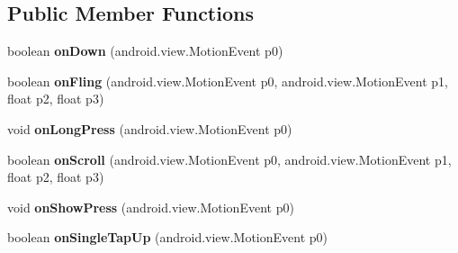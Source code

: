 \subsection*{Public Member Functions}
\begin{DoxyCompactItemize}
\item 
\hypertarget{classmd5282f1122c1313907b9bf274dd2c2f344_1_1InnerGestureListener_a35e0fbcf3351f7095076551b54457c99}{}boolean {\bfseries on\+Down} (android.\+view.\+Motion\+Event p0)\label{classmd5282f1122c1313907b9bf274dd2c2f344_1_1InnerGestureListener_a35e0fbcf3351f7095076551b54457c99}

\item 
\hypertarget{classmd5282f1122c1313907b9bf274dd2c2f344_1_1InnerGestureListener_ad63dbd861add83d141f8ca3b3ffdec62}{}boolean {\bfseries on\+Fling} (android.\+view.\+Motion\+Event p0, android.\+view.\+Motion\+Event p1, float p2, float p3)\label{classmd5282f1122c1313907b9bf274dd2c2f344_1_1InnerGestureListener_ad63dbd861add83d141f8ca3b3ffdec62}

\item 
\hypertarget{classmd5282f1122c1313907b9bf274dd2c2f344_1_1InnerGestureListener_a5aafe59ea26828081a2a01e237f7ae8d}{}void {\bfseries on\+Long\+Press} (android.\+view.\+Motion\+Event p0)\label{classmd5282f1122c1313907b9bf274dd2c2f344_1_1InnerGestureListener_a5aafe59ea26828081a2a01e237f7ae8d}

\item 
\hypertarget{classmd5282f1122c1313907b9bf274dd2c2f344_1_1InnerGestureListener_ae7f32d827c083992a07e0520485c9340}{}boolean {\bfseries on\+Scroll} (android.\+view.\+Motion\+Event p0, android.\+view.\+Motion\+Event p1, float p2, float p3)\label{classmd5282f1122c1313907b9bf274dd2c2f344_1_1InnerGestureListener_ae7f32d827c083992a07e0520485c9340}

\item 
\hypertarget{classmd5282f1122c1313907b9bf274dd2c2f344_1_1InnerGestureListener_a40f99fccff5667d8228a2c0ed28390b6}{}void {\bfseries on\+Show\+Press} (android.\+view.\+Motion\+Event p0)\label{classmd5282f1122c1313907b9bf274dd2c2f344_1_1InnerGestureListener_a40f99fccff5667d8228a2c0ed28390b6}

\item 
\hypertarget{classmd5282f1122c1313907b9bf274dd2c2f344_1_1InnerGestureListener_a66b329100b1bc9f5e6c0e0d91d2639d7}{}boolean {\bfseries on\+Single\+Tap\+Up} (android.\+view.\+Motion\+Event p0)\label{classmd5282f1122c1313907b9bf274dd2c2f344_1_1InnerGestureListener_a66b329100b1bc9f5e6c0e0d91d2639d7}


\end{DoxyCompactItemize}
